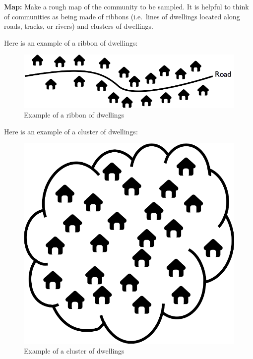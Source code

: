 \documentclass[12pt,a4paper]{book}
\theoremstyle{definition}
\theoremstyle{definition}
\theoremstyle{definition}
\theoremstyle{remark}
\begin{document}
\textbf{Map:} Make a rough map of the community to be sampled. It is
helpful to think of communities as being made of ribbons (i.e.~lines of
dwellings located along roads, tracks, or rivers) and clusters of
dwellings.

Here is an example of a ribbon of dwellings:

\begin{figure}[H]

{\centering \includegraphics[width=9.72in]{figures/stage2sample1} 

}

\caption{Example of a ribbon of dwellings}\label{fig:sample10}
\end{figure}

Here is an example of a cluster of dwellings:

\begin{figure}[H]

{\centering \includegraphics[width=9.72in]{figures/stage2sample2} 

}

\caption{Example of a cluster of dwellings}\label{fig:sample11}
\end{figure}
\end{document}
